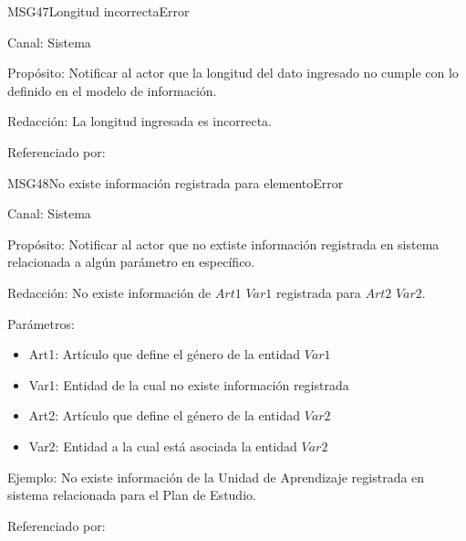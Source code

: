 \begin{mensaje}{MSG47}{Longitud incorrecta}{Error}
	\item[Canal:] Sistema
	\item[Propósito:] Notificar al actor que la longitud del dato ingresado no cumple con lo definido en el modelo de información. 
	\item[Redacción:] La longitud ingresada es incorrecta.
	\item[Referenciado por: ] 
\end{mensaje}


\begin{mensaje}{MSG48}{No existe información registrada para elemento}{Error}
	\item[Canal:] Sistema
	\item[Propósito:] Notificar al actor que no extiste información registrada en sistema relacionada a algún parámetro en específico.
	\item[Redacción:] No existe información de $Art1$ $Var1$ registrada para $Art2$ $Var2$.
	\item[Parámetros:] 
	\begin{itemize}
		\item Art1: Artículo que define el género de la entidad $Var1$
		\item Var1: Entidad de la cual no existe información registrada
		\item Art2: Artículo que define el género de la entidad $Var2$
		\item Var2: Entidad a la cual está asociada la entidad $Var2$
	\end{itemize}
	\item[Ejemplo:] No existe información de la Unidad de Aprendizaje registrada en sistema relacionada para el Plan de Estudio.
	\item[Referenciado por: ] 
\end{mensaje}

